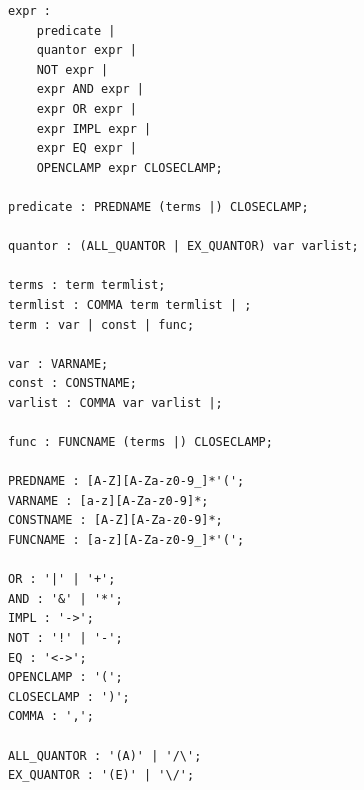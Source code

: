 \begin{lstlisting}[caption={Grammatik der Prädikatenlogik},label=lst:grammatik_prädlogik]
expr :
    predicate |
    quantor expr |
    NOT expr |
    expr AND expr |
    expr OR expr |
    expr IMPL expr |
    expr EQ expr |
    OPENCLAMP expr CLOSECLAMP;

predicate : PREDNAME (terms |) CLOSECLAMP;

quantor : (ALL_QUANTOR | EX_QUANTOR) var varlist;

terms : term termlist;
termlist : COMMA term termlist | ;
term : var | const | func;

var : VARNAME;
const : CONSTNAME;
varlist : COMMA var varlist |;

func : FUNCNAME (terms |) CLOSECLAMP;

PREDNAME : [A-Z][A-Za-z0-9_]*'(';
VARNAME : [a-z][A-Za-z0-9]*;
CONSTNAME : [A-Z][A-Za-z0-9]*;
FUNCNAME : [a-z][A-Za-z0-9_]*'(';

OR : '|' | '+';
AND : '&' | '*';
IMPL : '->';
NOT : '!' | '-';
EQ : '<->';
OPENCLAMP : '(';
CLOSECLAMP : ')';
COMMA : ',';

ALL_QUANTOR : '(A)' | '/\';
EX_QUANTOR : '(E)' | '\/';
\end{lstlisting}